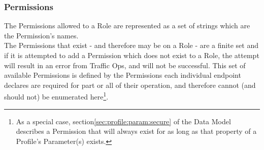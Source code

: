 \subsubsection{Permissions}
The Permissions allowed to a Role are represented as a set of strings which are
the Permission's names.\\
The Permissions that exist - and therefore may be on a Role - are a finite set
and if it is attempted to add a Permission which does not exist to a Role,
the attempt will result in an error from Traffic Ops, and will not be
successful. This set of available Permissions is defined by the Permissions
each individual endpoint declares are required for part or all of their
operation, and therefore cannot (and should not) be enumerated
here\footnote{As a special case, section\ref{sec:profile:param:secure} of the
Data Model describes a Permission that will always exist for as long as that
property of a Profile's Parameter(s) exists.}.
